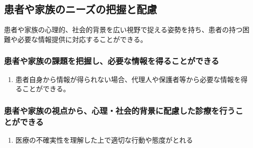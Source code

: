 \hypertarget{ux60a3ux8005ux3084ux5bb6ux65cfux306eux30cbux30fcux30baux306eux628aux63e1ux3068ux914dux616e}{%
\subsection{患者や家族のニーズの把握と配慮}\label{ux60a3ux8005ux3084ux5bb6ux65cfux306eux30cbux30fcux30baux306eux628aux63e1ux3068ux914dux616e}}

患者や家族の心理的、社会的背景を広い視野で捉える姿勢を持ち、患者の持つ困難や必要な情報提供に対応することができる。

\hypertarget{ux60a3ux8005ux3084ux5bb6ux65cfux306eux8ab2ux984cux3092ux628aux63e1ux3057ux5fc5ux8981ux306aux60c5ux5831ux3092ux5f97ux308bux3053ux3068ux304cux3067ux304dux308b}{%
\subsubsection{患者や家族の課題を把握し、必要な情報を得ることができる}\label{ux60a3ux8005ux3084ux5bb6ux65cfux306eux8ab2ux984cux3092ux628aux63e1ux3057ux5fc5ux8981ux306aux60c5ux5831ux3092ux5f97ux308bux3053ux3068ux304cux3067ux304dux308b}}

\begin{enumerate}
\def\labelenumi{\arabic{enumi}.}
\tightlist
\item
  患者自身から情報が得られない場合、代理人や保護者等から必要な情報を得ることができる。
\end{enumerate}

\hypertarget{ux60a3ux8005ux3084ux5bb6ux65cfux306eux8996ux70b9ux304bux3089ux5fc3ux7406ux793eux4f1aux7684ux80ccux666fux306bux914dux616eux3057ux305fux8a3aux7642ux3092ux884cux3046ux3053ux3068ux304cux3067ux304dux308b}{%
\subsubsection{患者や家族の視点から、心理・社会的背景に配慮した診療を行うことができる}\label{ux60a3ux8005ux3084ux5bb6ux65cfux306eux8996ux70b9ux304bux3089ux5fc3ux7406ux793eux4f1aux7684ux80ccux666fux306bux914dux616eux3057ux305fux8a3aux7642ux3092ux884cux3046ux3053ux3068ux304cux3067ux304dux308b}}

\begin{enumerate}
\def\labelenumi{\arabic{enumi}.}
\tightlist
\item
  医療の不確実性を理解した上で適切な行動や態度がとれる
\end{enumerate}

\newpage

